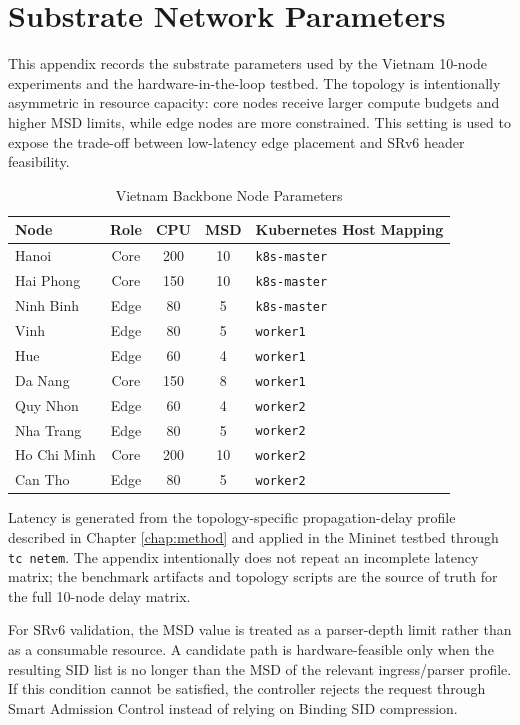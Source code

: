 \documentclass[12pt, a4paper, reqno, oneside]{book}
\begin{document}
\appendix
\chapter{Substrate Network Parameters}
\label{appendix:topology}
This appendix records the substrate parameters used by the Vietnam 10-node experiments and the hardware-in-the-loop testbed. The topology is intentionally asymmetric in resource capacity: core nodes receive larger compute budgets and higher MSD limits, while edge nodes are more constrained. This setting is used to expose the trade-off between low-latency edge placement and SRv6 header feasibility.

\begin{table}[H]
\centering
\caption{Vietnam Backbone Node Parameters}
\label{table:appendix_node_config}
\small
\begin{tabular}{lcccp{4.2cm}}
\toprule
\textbf{Node} & \textbf{Role} & \textbf{CPU} & \textbf{MSD} & \textbf{Kubernetes Host Mapping} \\
\midrule
Hanoi         & Core & 200 & 10 & \texttt{k8s-master} \\
Hai Phong     & Core & 150 & 10 & \texttt{k8s-master} \\
Ninh Binh     & Edge & 80  & 5  & \texttt{k8s-master} \\
Vinh          & Edge & 80  & 5  & \texttt{worker1} \\
Hue           & Edge & 60  & 4  & \texttt{worker1} \\
Da Nang       & Core & 150 & 8  & \texttt{worker1} \\
Quy Nhon      & Edge & 60  & 4  & \texttt{worker2} \\
Nha Trang     & Edge & 80  & 5  & \texttt{worker2} \\
Ho Chi Minh   & Core & 200 & 10 & \texttt{worker2} \\
Can Tho       & Edge & 80  & 5  & \texttt{worker2} \\
\bottomrule
\end{tabular}
\end{table}

Latency is generated from the topology-specific propagation-delay profile described in Chapter \ref{chap:method} and applied in the Mininet testbed through \texttt{tc netem}. The appendix intentionally does not repeat an incomplete latency matrix; the benchmark artifacts and topology scripts are the source of truth for the full 10-node delay matrix.

For SRv6 validation, the MSD value is treated as a parser-depth limit rather than as a consumable resource. A candidate path is hardware-feasible only when the resulting SID list is no longer than the MSD of the relevant ingress/parser profile. If this condition cannot be satisfied, the controller rejects the request through Smart Admission Control instead of relying on Binding SID compression.
\end{document}

